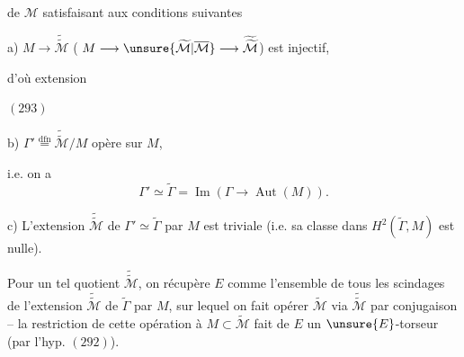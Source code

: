 
de $\mathcal M$ satisfaisant aux conditions suivantes

\par a) $M\longrightarrow\widetilde{\widetilde{\mathcal M}}$ ( $M\longrightarrow\unsure{\widetilde{\mathcal M}|\overline{\mathcal M}}\longrightarrow\widetilde{\widetilde{\mathcal M}}$) est injectif,

\par {}

\par d'où extension

\par $(293)$\quad
{}

\par b)  $\Gamma'\overset{\mathrm{dfn}}{=}\widetilde{\widetilde{\mathcal M}}/M$ opère \uline{} sur $M$,

\par i.e. on a
\[
\Gamma'\simeq\widetilde\Gamma=\operatorname{Im}(\Gamma\longrightarrow\operatorname{Aut}(M)).
\]

\par c) L'extension $\widetilde{\widetilde{\mathcal M}}$ de $\Gamma'\simeq\widetilde\Gamma$ par $M$ est triviale (i.e. sa classe dans $H^2(\widetilde\Gamma,M)$ est nulle).

\par Pour un tel quotient $\widetilde{\widetilde{\mathcal M}}$, on récupère $E$ comme l'ensemble de tous les scindages de l'extension $\widetilde{\widetilde{\mathcal M}}$ de $\widetilde\Gamma$ par $M$,  sur lequel on fait opérer $\widetilde{\mathcal M}$ via $\widetilde{\widetilde{\mathcal M}}$ par conjugaison -- la restriction de cette opération à $M\subset\widetilde{\mathcal M}$ fait de $E$ un $\unsure{E}$-torseur (par l'hyp. $(292)$).


